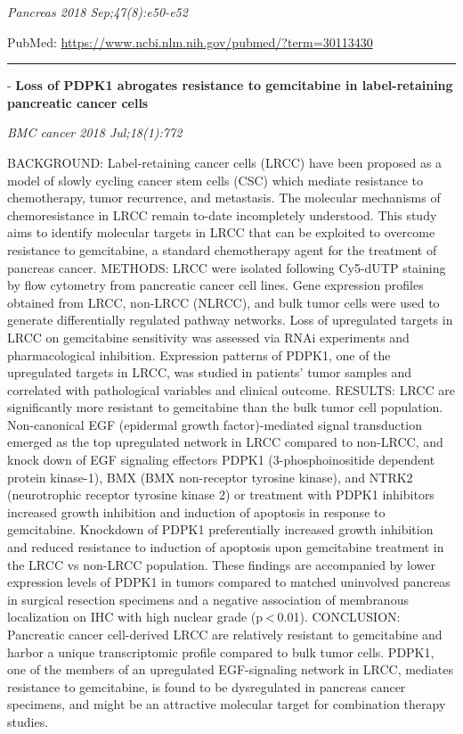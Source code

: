 \documentclass[]{article}
\begin{document}
\emph{Pancreas 2018 Sep;47(8):e50-e52}

PubMed: \url{https://www.ncbi.nlm.nih.gov/pubmed/?term=30113430}

{}

{}

\begin{center}\rule{0.5\linewidth}{\linethickness}\end{center}

 - \textbf{Loss of PDPK1 abrogates resistance to gemcitabine in
label-retaining pancreatic cancer cells}

\emph{BMC cancer 2018 Jul;18(1):772}

BACKGROUND: Label-retaining cancer cells (LRCC) have been proposed as a
model of slowly cycling cancer stem cells (CSC) which mediate resistance
to chemotherapy, tumor recurrence, and metastasis. The molecular
mechanisms of chemoresistance in LRCC remain to-date incompletely
understood. This study aims to identify molecular targets in LRCC that
can be exploited to overcome resistance to gemcitabine, a standard
chemotherapy agent for the treatment of pancreas cancer. METHODS: LRCC
were isolated following Cy5-dUTP staining by flow cytometry from
pancreatic cancer cell lines. Gene expression profiles obtained from
LRCC, non-LRCC (NLRCC), and bulk tumor cells were used to generate
differentially regulated pathway networks. Loss of upregulated targets
in LRCC on gemcitabine sensitivity was assessed via RNAi experiments and
pharmacological inhibition. Expression patterns of PDPK1, one of the
upregulated targets in LRCC, was studied in patients' tumor samples and
correlated with pathological variables and clinical outcome. RESULTS:
LRCC are significantly more resistant to gemcitabine than the bulk tumor
cell population. Non-canonical EGF (epidermal growth factor)-mediated
signal transduction emerged as the top upregulated network in LRCC
compared to non-LRCC, and knock down of EGF signaling effectors PDPK1
(3-phosphoinositide dependent protein kinase-1), BMX (BMX non-receptor
tyrosine kinase), and NTRK2 (neurotrophic receptor tyrosine kinase 2) or
treatment with PDPK1 inhibitors increased growth inhibition and
induction of apoptosis in response to gemcitabine. Knockdown of PDPK1
preferentially increased growth inhibition and reduced resistance to
induction of apoptosis upon gemcitabine treatment in the LRCC vs
non-LRCC population. These findings are accompanied by lower expression
levels of PDPK1 in tumors compared to matched uninvolved pancreas in
surgical resection specimens and a negative association of membranous
localization on IHC with high nuclear grade (p \textless{} 0.01).
CONCLUSION: Pancreatic cancer cell-derived LRCC are relatively resistant
to gemcitabine and harbor a unique transcriptomic profile compared to
bulk tumor cells. PDPK1, one of the members of an upregulated
EGF-signaling network in LRCC, mediates resistance to gemcitabine, is
found to be dysregulated in pancreas cancer specimens, and might be an
attractive molecular target for combination therapy studies.
\end{document}
